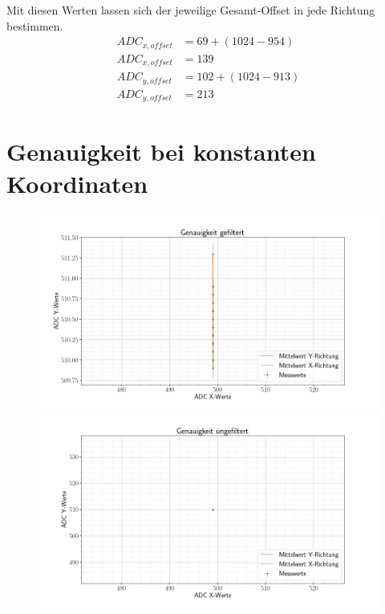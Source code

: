 Mit diesen Werten lassen sich der jeweilige Gesamt-Offset in jede Richtung bestimmen.
\begin{align}
    ADC_{x,offset} &= 69 +(1024-954)\nonumber\\
    ADC_{x,offset} &= 139\label{eq:adcxoffset}\\
    ADC_{y,offset} &= 102+(1024-913)\nonumber\\
    ADC_{y,offset} &= 213\label{eq:adcyoffset}
\end{align}

\section{Genauigkeit bei konstanten Koordinaten}
\label{ab:genau}
\begin{figure}[ht!]
    \centering
    \includegraphics[width=\linewidth]{fig/filtered.png}
    \caption{}
    \label{fig:filtered}
    \includegraphics[width=\linewidth]{fig/unfiltered.png}
    \caption{}
    \label{fig:unfiltered}
\end{figure}
